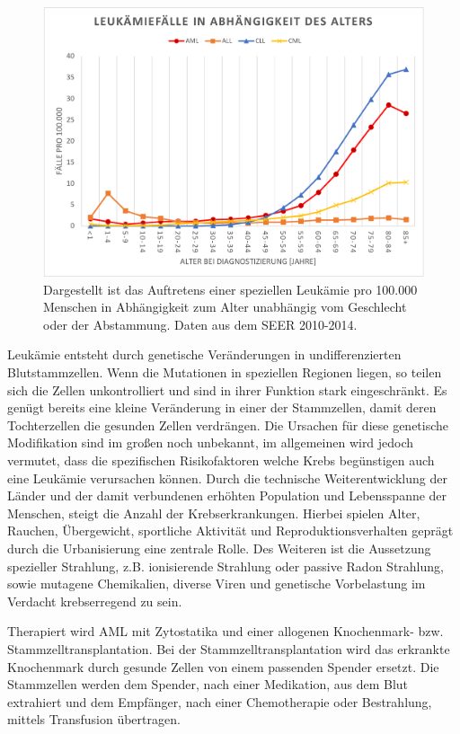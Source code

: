 \begin{figure}
\centering
\includegraphics[width=.99\textwidth]{images/Age_AML_ALL.pdf}
\caption{Dargestellt ist das Auftretens einer speziellen Leukämie pro 100.000 Menschen in Abhängigkeit zum Alter unabhängig vom Geschlecht oder der Abstammung. Daten aus dem SEER 2010-2014.}
\label{fig:Age_AML_ALL}
\end{figure}

Leukämie entsteht durch genetische Veränderungen in undifferenzierten Blutstammzellen. Wenn die Mutationen in speziellen Regionen liegen\cite{Wakita.2016}, so teilen sich die Zellen unkontrolliert und sind in ihrer Funktion stark eingeschränkt. Es genügt bereits eine kleine Veränderung in einer der Stammzellen, damit deren Tochterzellen die gesunden Zellen verdrängen. Die Ursachen für diese genetische Modifikation sind im großen noch unbekannt, im allgemeinen wird jedoch vermutet, dass die spezifischen Risikofaktoren welche Krebs begünstigen auch eine Leukämie verursachen können\cite{Petit.2014}. Durch die technische Weiterentwicklung der Länder und der damit verbundenen erhöhten Population und Lebensspanne der Menschen, steigt die Anzahl der Krebserkrankungen. Hierbei spielen Alter, Rauchen, Übergewicht, sportliche Aktivität und Reproduktionsverhalten geprägt durch die Urbanisierung eine zentrale Rolle\cite{Torre.2015}. Des Weiteren ist die Aussetzung spezieller Strahlung, z.B. ionisierende Strahlung oder passive Radon Strahlung, sowie mutagene Chemikalien, diverse Viren und genetische Vorbelastung im Verdacht krebserregend zu sein.

Therapiert wird \ac{AML} mit Zytostatika und einer allogenen Knochenmark- bzw. Stammzelltransplantation\cite{Cheson.2003}. Bei der Stamm\-zell\-trans\-plan\-tat\-ion wird das erkrankte Knochenmark durch gesunde Zellen von einem passenden Spender ersetzt. Die Stammzellen werden dem Spender, nach einer Medikation, aus dem Blut extrahiert und dem Empfänger, nach einer Chemotherapie oder Bestrahlung, mittels Transfusion übertragen. 

